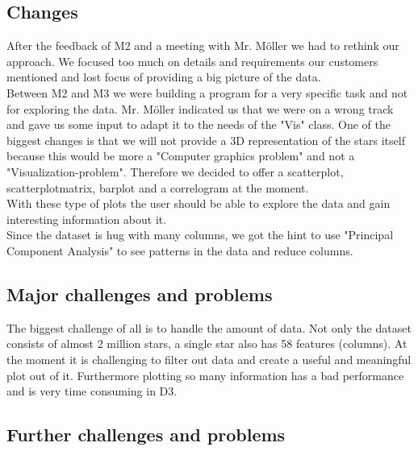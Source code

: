 \documentclass{article}
\begin{document}
\subsection{Changes}
After the feedback of M2 and a meeting with Mr. Möller we had to rethink our approach. We focused too much on details and requirements our customers mentioned and lost focus of providing a big picture of the data.\\
Between M2 and M3 we were building a program for a very specific task and not for exploring the data. Mr. Möller indicated us that we were on a wrong track and gave us some input to adapt it to the needs of the "Vis" class. One of the biggest changes is that we will not provide a 3D representation of the stars itself because this would be more a "Computer graphics problem" and not a "Visualization-problem". Therefore we decided to offer a scatterplot, scatterplotmatrix, barplot and a correlogram at the moment.\\
With these type of plots the user should be able to explore the data and gain interesting information about it.\\
Since the dataset is hug with many columns, we got the hint to use "Principal Component Analysis" to see patterns in the data and reduce columns.
\subsection{Major challenges and problems}
The biggest challenge of all is to handle the amount of data. Not only the dataset consists of almost 2 million stars, a single star also has 58 features (columns). At the moment it is challenging to filter out data and create a useful and meaningful plot out of it.  Furthermore plotting so many information has a bad performance and is very time consuming in D3.
\subsection{Further challenges and problems}
\end{document}
